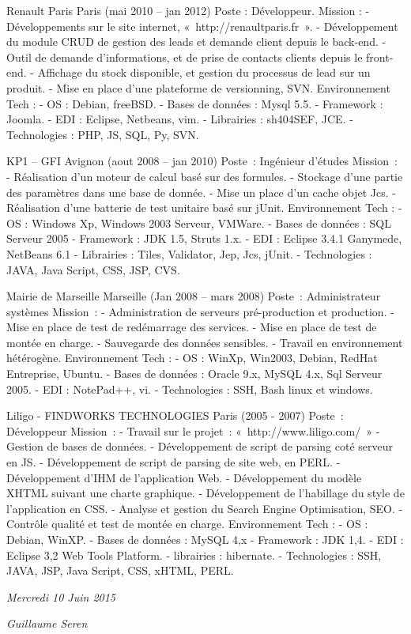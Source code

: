 \documentclass[]{GuillaumeSeren-cv}
\begin{document}
\begin{entrylist}
  \entry
  {Renault Paris}
  {Paris (mai 2010 – jan 2012)}
  {Poste : Développeur.}
  {Mission :
- Développements sur le site internet, « http://renaultparis.fr ».
- Développement du module CRUD de gestion des leads et demande client depuis le back-end.
- Outil de demande d'informations, et de prise de contacts clients depuis le front-end.
- Affichage du stock disponible, et gestion du processus de lead sur un produit.
- Mise en place d'une plateforme de versionning, SVN.
Environnement Tech :
- OS : Debian, freeBSD.
- Bases de données : Mysql 5.5.
- Framework : Joomla.
- EDI : Eclipse, Netbeans, vim.
- Librairies : sh404SEF, JCE.
- Technologies : PHP, JS, SQL, Py, SVN.}

  \entry
  {KP1 – GFI}
  {Avignon (aout 2008 – jan 2010)}
  {Poste : Ingénieur d'études}
  {Mission :
- Réalisation d'un moteur de calcul basé sur des formules.
- Stockage d'une partie des paramètres dans une base de donnée.
- Mise un place d'un cache objet Jcs.
- Réalisation d'une batterie de test unitaire basé sur jUnit.
Environnement Tech :
- OS : Windows Xp, Windows 2003 Serveur, VMWare.
- Bases de données : SQL Serveur 2005
- Framework : JDK 1.5,  Struts 1.x.
- EDI : Eclipse 3.4.1 Ganymede, NetBeans 6.1
- Librairies : Tiles, Validator, Jep, Jcs, jUnit.
- Technologies : JAVA, Java Script, CSS, JSP, CVS.}

  \entry
  {Mairie de Marseille}
  {Marseille (Jan 2008 – mars 2008)}
  {Poste : Administrateur systèmes}
  {Mission :
- Administration de serveurs pré-production et production.
- Mise en place de test de redémarrage des services.
- Mise en place de test de montée en charge.
- Sauvegarde des données sensibles.
- Travail en environnement hétérogène.
Environnement Tech :
- OS : WinXp, Win2003, Debian, RedHat Entreprise, Ubuntu.
- Bases de données : Oracle 9.x, MySQL 4.x, Sql Serveur 2005.
- EDI : NotePad++, vi.
- Technologies : SSH, Bash linux et windows.}

  \entry
  {Liligo - FINDWORKS TECHNOLOGIES}
  {Paris (2005 - 2007)}
  {Poste : Développeur}
  {Mission :
- Travail sur le projet : « http://www.liligo.com/ »
- Gestion de bases de données.
- Développement de script de parsing coté serveur en JS.
- Développement de script de parsing de site web, en PERL.
- Développement d'IHM de l'application Web.
- Développement du modèle XHTML suivant une charte graphique.
- Développement de l’habillage du style de l'application en CSS.
- Analyse et gestion du Search Engine Optimisation, SEO.
- Contrôle qualité et test de montée en charge.
Environnement Tech :
- OS : Debian, WinXP.
- Bases de données : MySQL 4,x
- Framework : JDK 1,4.
- EDI : Eclipse 3,2 Web Tools Platform.
- librairies : hibernate.
- Technologies : SSH, JAVA, JSP, Java Script, CSS, xHTML, PERL.}
\end{entrylist}

\begin{flushleft}
\emph{Mercredi 10 Juin 2015}
\end{flushleft}

\begin{flushright}
\emph{Guillaume Seren}
\end{flushright}
\end{document}
